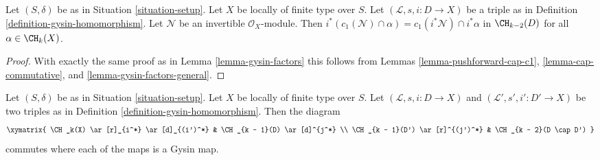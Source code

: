 \begin{lemma}
\label{lemma-gysin-commutes-cap-c1}
Let $(S, \delta)$ be as in Situation \ref{situation-setup}. Let $X$ be
locally of finite type over $S$. Let $(\mathcal{L}, s, i : D \to X)$
be a triple as in Definition \ref{definition-gysin-homomorphism}.
Let $\mathcal{N}$ be an invertible $\mathcal{O}_X$-module.
Then $i^*(c_1(\mathcal{N}) \cap \alpha) = c_1(i^*\mathcal{N}) \cap i^*\alpha$
in $\CH_{k - 2}(D)$ for all $\alpha \in \CH_k(X)$.
\end{lemma}

\begin{proof}
With exactly the same proof as in Lemma \ref{lemma-gysin-factors}
this follows from Lemmas
\ref{lemma-pushforward-cap-c1},
\ref{lemma-cap-commutative}, and
\ref{lemma-gysin-factors-general}.
\end{proof}

\begin{lemma}
\label{lemma-gysin-commutes-gysin}
Let $(S, \delta)$ be as in Situation \ref{situation-setup}. Let $X$ be locally
of finite type over $S$. Let $(\mathcal{L}, s, i : D \to X)$ and
$(\mathcal{L}', s', i' : D' \to X)$ be two triples as in
Definition \ref{definition-gysin-homomorphism}. Then the diagram
$$
\xymatrix{
\CH_k(X) \ar[r]_{i^*} \ar[d]_{(i')^*} & \CH_{k - 1}(D) \ar[d]^{j^*} \\
\CH_{k - 1}(D') \ar[r]^{(j')^*} & \CH_{k - 2}(D \cap D')
}
$$
commutes where each of the maps is a Gysin map.
\end{lemma}


